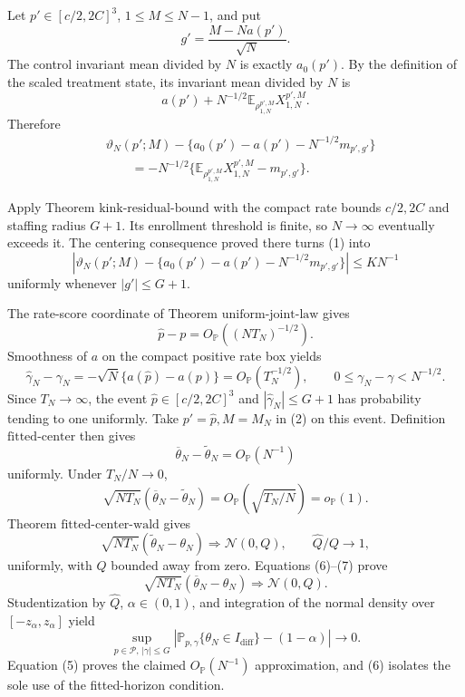 Let \(p'\in[c/2,2C]^3\), \(1\leq M\leq N-1\), and put
\[
 g'=\frac{M-Na(p')}{\sqrt N}.
\]
The control invariant mean divided by \(N\) is exactly \(a_0(p')\).  By the definition of the scaled treatment state, its invariant mean divided by \(N\) is
\[
 a(p')+N^{-1/2}\mathbb E_{\rho_{1,N}^{p',M}}X_{1,N}^{p',M}.
\]
Therefore
\[
 \begin{split}
 &\vartheta_N(p';M)-
 \{a_0(p')-a(p')-N^{-1/2}m_{p',g'}\}\\
 &\qquad=-N^{-1/2}
 \{\mathbb E_{\rho_{1,N}^{p',M}}X_{1,N}^{p',M}-m_{p',g'}\}. \tag{1}
 \end{split}
\]

Apply Theorem \(\mathrm{kink\mbox{-}residual\mbox{-}bound}\) with the compact rate bounds \(c/2,2C\) and staffing radius \(G+1\).  Its enrollment threshold is finite, so \(N\to\infty\) eventually exceeds it.  The centering consequence proved there turns (1) into
\[
 \left|\vartheta_N(p';M)-
 \{a_0(p')-a(p')-N^{-1/2}m_{p',g'}\}\right|
 \leq K N^{-1}                                                \tag{2}
\]
uniformly whenever \(|g'|\leq G+1\).

The rate-score coordinate of Theorem \(\mathrm{uniform\mbox{-}joint\mbox{-}law}\) gives
\[
 \widehat p-p=O_{\mathbb P}((NT_N)^{-1/2}).                   \tag{3}
\]
Smoothness of \(a\) on the compact positive rate box yields
\[
 \widehat\gamma_N-\gamma_N
 =-\sqrt N\{a(\widehat p)-a(p)\}=O_{\mathbb P}(T_N^{-1/2}),
 \qquad 0\leq\gamma_N-\gamma<N^{-1/2}.                       \tag{4}
\]
Since \(T_N\to\infty\), the event \(\widehat p\in[c/2,2C]^3\) and \(|\widehat\gamma_N|\leq G+1\) has probability tending to one uniformly.  Take \(p'=\widehat p,M=M_N\) in (2) on this event.  Definition \(\mathrm{fitted\mbox{-}center}\) then gives
\[
 \overline\theta_N-\widetilde\theta_N=O_{\mathbb P}(N^{-1}) \tag{5}
\]
uniformly.  Under \(T_N/N\to0\),
\[
 \sqrt{NT_N}(\overline\theta_N-\widetilde\theta_N)
 =O_{\mathbb P}(\sqrt{T_N/N})=o_{\mathbb P}(1).               \tag{6}
\]
Theorem \(\mathrm{fitted\mbox{-}center\mbox{-}wald}\) gives
\[
 \sqrt{NT_N}(\widetilde\theta_N-\theta_N)
 \Rightarrow\mathcal N(0,Q),
 \qquad \widehat Q/Q\to1,                                    \tag{7}
\]
uniformly, with \(Q\) bounded away from zero.  Equations (6)--(7) prove
\[
 \sqrt{NT_N}(\overline\theta_N-\theta_N)
 \Rightarrow\mathcal N(0,Q).
\]
Studentization by \(\widehat Q\), \(\alpha\in(0,1)\), and integration of the normal density over \([-z_\alpha,z_\alpha]\) yield
\[
 \sup_{p\in\mathcal P,\,|\gamma|\leq G}
 \left|\mathbb P_{p,\gamma}\{\theta_N\in I_{\mathrm{diff}}\}-(1-\alpha)\right|
 \longrightarrow0.
\]
Equation (5) proves the claimed \(O_{\mathbb P}(N^{-1})\) approximation, and (6) isolates the sole use of the fitted-horizon condition.

